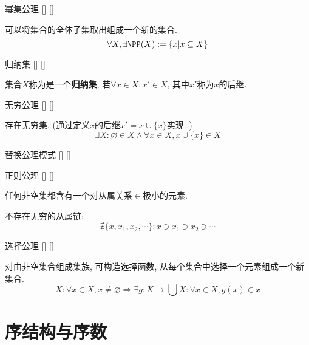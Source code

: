 \documentclass[UTF8]{ctexart}
\begin{document}
    \begin{axm}
        []
        {幂集公理}
        []
        []


        可以将集合的全体子集取出组成一个新的集合. 
        \[\forall X, \exists\PP(X):=\{x|x\subseteq X\}\]
    \end{axm}
    
    \begin{dfn}
        []
        {归纳集}
        []
        []


        集合$X$称为是一个\textbf{归纳集}, 若$\forall x\in X, x'\in X$, 其中$x'$称为$x$的后继. 
    \end{dfn}
    
    \begin{axm}
        []
        {无穷公理}
        []
        []

        
        存在无穷集. (通过定义$x$的后继$x'=x\cup\{x\}$实现. )
        \[\exists X: \varnothing\in X\wedge\forall x\in X, x\cup\{x\}\in X\]
    \end{axm}
    
    \begin{axm}
        []
        {替换公理模式}
        []
        []

    \end{axm}
    
    \begin{axm}
        []
        {正则公理}
        []
        []


        任何非空集都含有一个对从属关系$\in$极小的元素. 
    \end{axm}
    
    \begin{thm}
        不存在无穷的从属链: 
        \[\nexists \{x,x_1,x_2,\cdots\}: x\ni x_1\ni x_2\ni \cdots\]
    \end{thm}
    
    \begin{axm}
        []
        {选择公理}
        []
        []


        对由非空集合组成集族, 可构造选择函数, 从每个集合中选择一个元素组成一个新集合. 
        \[X: \forall x\in X, x\neq\varnothing\Longrightarrow\exists g:X\to\bigcup X: \forall x\in X, g(x)\in x\]
    \end{axm}

\section{序结构与序数}
\end{document}
